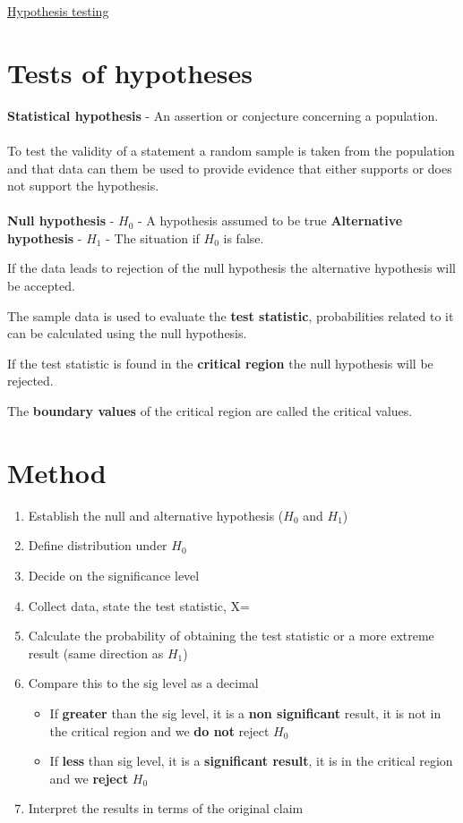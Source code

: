\documentclass{article}[18pt]
\begin{document}
\begin{center}
\underline{\huge Hypothesis testing}
\end{center}
\section{Tests of hypotheses}
\textbf{Statistical hypothesis} - An assertion or conjecture concerning a population.\\
\\
To test the validity of a statement a random sample is taken from the population and that data can them be used to provide evidence that either supports or does not support the hypothesis.\\
\\
\textbf{Null hypothesis} - $H_0$ - A hypothesis assumed to be true
\textbf{Alternative hypothesis} - $H_1$ - The situation if $H_0$ is false.

If the data leads to rejection of the null hypothesis the alternative hypothesis will be accepted.

The sample data is used to evaluate the \textbf{test statistic}, probabilities related to it can be calculated using the null hypothesis.

If the test statistic is found in the \textbf{critical region} the null hypothesis will be rejected.

The \textbf{boundary values} of the critical region are called the critical values.
\section{Method}
\begin{enumerate}
\item Establish the null and alternative hypothesis ($H_0$ and $H_1$)
\item Define distribution under $H_0$
\item Decide on the significance level
\item Collect data, state the test statistic, X=
\item Calculate the probability of obtaining the test statistic or a more extreme result (same direction as $H_1$)
\item Compare this to the sig level as a decimal
\begin{itemize}
\item If \textbf{greater} than the sig level, it is a \textbf{non significant} result, it is not in the critical region and we \textbf{do not} reject $H_0$
\item If \textbf{less} than sig level, it is a \textbf{significant result}, it is in the critical region and we \textbf{reject} $H_0$ 
\end{itemize}
\item Interpret the results in terms of the original claim
\end{enumerate}
 
\end{document}
